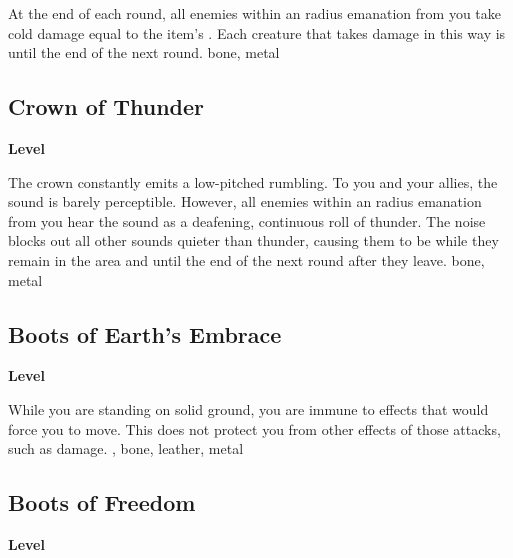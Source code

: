 \vspace{-1.5em}  %
At the end of each round, all enemies within an \areamed radius emanation from you take cold damage equal to the item's .
Each creature that takes damage in this way is \fatigued until the end of the next round.
 
 bone, metal
\begin{multicols}{2}
\lowercase{\hypertarget{item:Crown of Thunder}{}}\label{item:Crown of Thunder}
\hypertarget{item:Crown of Thunder}{\subsection{Crown of Thunder}}
\columnbreak%
\begin{flushright}
\large\textbf{ Level}
\end{flushright}
\end{multicols}
\vspace{-1.5em}  %
The crown constantly emits a low-pitched rumbling.
To you and your allies, the sound is barely perceptible.
However, all enemies within an \arealarge radius emanation from you hear the sound as a deafening, continuous roll of thunder.
The noise blocks out all other sounds quieter than thunder, causing them to be \deafened while they remain in the area and until the end of the next round after they leave.
 
 bone, metal
\begin{multicols}{2}
\lowercase{\hypertarget{item:Boots of Earth's Embrace}{}}\label{item:Boots of Earth's Embrace}
\hypertarget{item:Boots of Earth's Embrace}{\subsection{Boots of Earth's Embrace}}
\columnbreak%
\begin{flushright}
\large\textbf{ Level}
\end{flushright}
\end{multicols}
\vspace{-1.5em}  %
While you are standing on solid ground, you are immune to effects that would force you to move.
This does not protect you from other effects of those attacks, such as damage.
 , 
 bone, leather, metal
\begin{multicols}{2}
\lowercase{\hypertarget{item:Boots of Freedom}{}}\label{item:Boots of Freedom}
\hypertarget{item:Boots of Freedom}{\subsection{Boots of Freedom}}
\columnbreak%
\begin{flushright}
\large\textbf{ Level}
\end{flushright}
\end{multicols}
